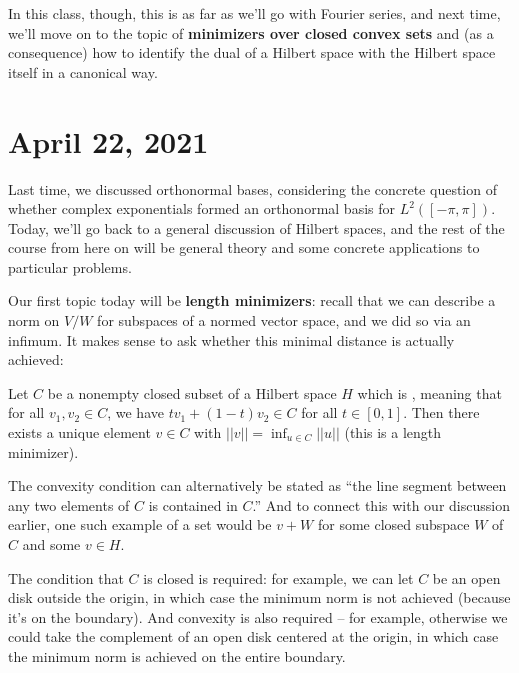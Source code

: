 In this class, though, this is as far as we'll go with Fourier series, and next time, we'll move on to the topic of \textbf{minimizers over closed convex sets} and (as a consequence) how to identify the dual of a Hilbert space with the Hilbert space itself in a canonical way. 


\pagebreak\section*{April 22, 2021}

Last time, we discussed orthonormal bases, considering the concrete question of whether complex exponentials formed an orthonormal basis for $L^2([-\pi, \pi])$. Today, we'll go back to a general discussion of Hilbert spaces, and the rest of the course from here on will be general theory and some concrete applications to particular problems. 

Our first topic today will be \textbf{length minimizers}: recall that we can describe a norm on $V/W$ for subspaces of a normed vector space, and we did so via an infimum. It makes sense to ask whether this minimal distance is actually achieved:

\begin{theorem}\label{lengthminimizer}
Let $C$ be a nonempty closed subset of a Hilbert space $H$ which is , meaning that for all $v_1, v_2 \in C$, we have $tv_1 + (1-t)v_2 \in C$ for all $t \in [0, 1]$. Then there exists a unique element $v \in C$ with $||v|| = \inf_{u \in C} ||u||$ (this is a length minimizer).
\end{theorem}

The convexity condition can alternatively be stated as ``the line segment between any two elements of $C$ is contained in $C$.'' And to connect this with our discussion earlier, one such example of a set would be $v + W$ for some closed subspace $W$ of $C$ and some $v \in H$. 

\begin{remark}
The condition that $C$ is closed is required: for example, we can let $C$ be an open disk outside the origin, in which case the minimum norm is not achieved (because it's on the boundary). And convexity is also required -- for example, otherwise we could take the complement of an open disk centered at the origin, in which case the minimum norm is achieved on the entire boundary. 
\end{remark} 

